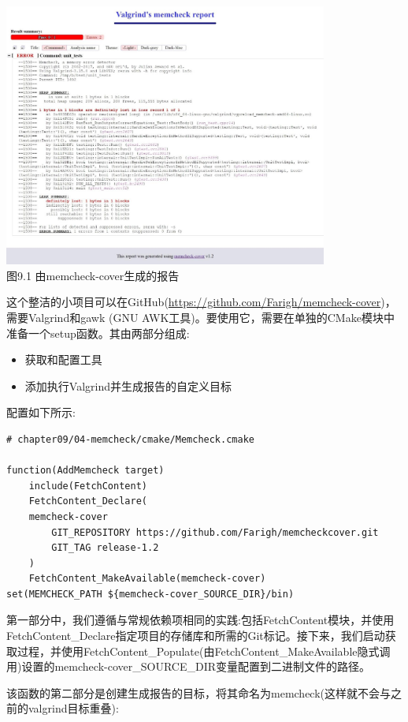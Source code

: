 \begin{center}
\includegraphics[width=0.8\textwidth]{content/3/chapter9/images/1.jpg}\\
图9.1 由memcheck-cover生成的报告
\end{center}

这个整洁的小项目可以在GitHub(\url{https://github.com/Farigh/memcheck-cover})，需要Valgrind和gawk (GNU AWK工具)。要使用它，需要在单独的CMake模块中准备一个setup函数。其由两部分组成:

\begin{itemize}
\item 
获取和配置工具

\item 
添加执行Valgrind并生成报告的自定义目标
\end{itemize}

配置如下所示:

\begin{lstlisting}[style=styleCMake]
# chapter09/04-memcheck/cmake/Memcheck.cmake

function(AddMemcheck target)
	include(FetchContent)
	FetchContent_Declare(
	memcheck-cover
		GIT_REPOSITORY https://github.com/Farigh/memcheckcover.git
		GIT_TAG release-1.2
	)
	FetchContent_MakeAvailable(memcheck-cover)
set(MEMCHECK_PATH ${memcheck-cover_SOURCE_DIR}/bin)
\end{lstlisting}

第一部分中，我们遵循与常规依赖项相同的实践:包括FetchContent模块，并使用FetchContent\_Declare指定项目的存储库和所需的Git标记。接下来，我们启动获取过程，并使用FetchContent\_Populate(由FetchContent\_MakeAvailable隐式调用)设置的memcheck-cover\_SOURCE\_DIR变量配置到二进制文件的路径。

该函数的第二部分是创建生成报告的目标，将其命名为memcheck(这样就不会与之前的valgrind目标重叠):

